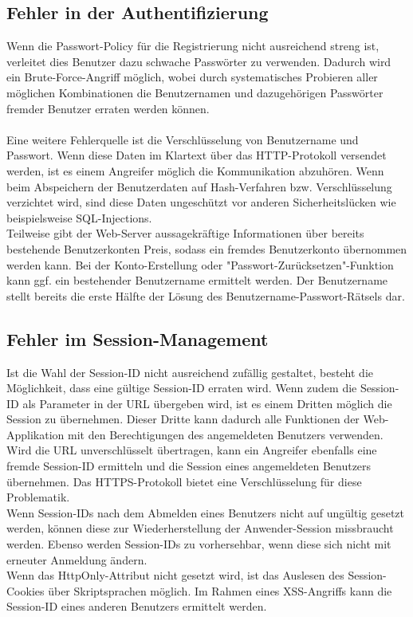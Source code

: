 \subsection{Fehler in der Authentifizierung}
Wenn die Passwort-Policy für die Registrierung nicht ausreichend streng ist, verleitet dies Benutzer dazu schwache Passwörter zu verwenden. Dadurch wird ein Brute-Force-Angriff möglich, wobei durch systematisches Probieren aller möglichen Kombinationen die Benutzernamen und dazugehörigen Passwörter fremder Benutzer erraten werden können.\\\\
Eine weitere Fehlerquelle ist die Verschlüsselung von Benutzername und Passwort. Wenn diese Daten im Klartext über das HTTP-Protokoll versendet werden, ist es einem Angreifer möglich die Kommunikation abzuhören. Wenn beim Abspeichern der Benutzerdaten auf Hash-Verfahren bzw. Verschlüsselung verzichtet wird, sind diese Daten ungeschützt vor anderen Sicherheitslücken wie beispielsweise SQL-Injections.\\
Teilweise gibt der Web-Server aussagekräftige Informationen über bereits bestehende Benutzerkonten Preis, sodass ein fremdes Benutzerkonto übernommen werden kann. Bei der Konto-Erstellung oder "Passwort-Zurücksetzen"-Funktion kann ggf. ein bestehender Benutzername ermittelt werden. Der Benutzername stellt bereits die erste Hälfte der Lösung des Benutzername-Passwort-Rätsels dar.

\subsection{Fehler im Session-Management}
Ist die Wahl der Session-ID nicht ausreichend zufällig gestaltet, besteht die Möglichkeit, dass eine gültige Session-ID erraten wird. Wenn zudem die Session-ID als Parameter in der URL übergeben wird, ist es einem Dritten möglich die Session zu übernehmen. Dieser Dritte kann dadurch alle Funktionen der Web-Applikation mit den Berechtigungen des angemeldeten Benutzers verwenden. Wird die URL unverschlüsselt übertragen, kann ein Angreifer ebenfalls eine fremde Session-ID ermitteln und die Session eines angemeldeten Benutzers übernehmen. Das HTTPS-Protokoll bietet eine Verschlüsselung für diese Problematik.\\
Wenn Session-IDs nach dem Abmelden eines Benutzers nicht auf ungültig gesetzt werden, können diese zur Wiederherstellung der Anwender-Session missbraucht werden. Ebenso werden Session-IDs zu vorhersehbar, wenn diese sich nicht mit erneuter Anmeldung ändern.\\
Wenn das HttpOnly-Attribut nicht gesetzt wird, ist das Auslesen des Session-Cookies über Skriptsprachen möglich. Im Rahmen eines XSS-Angriffs kann die Session-ID eines anderen Benutzers ermittelt werden. 

